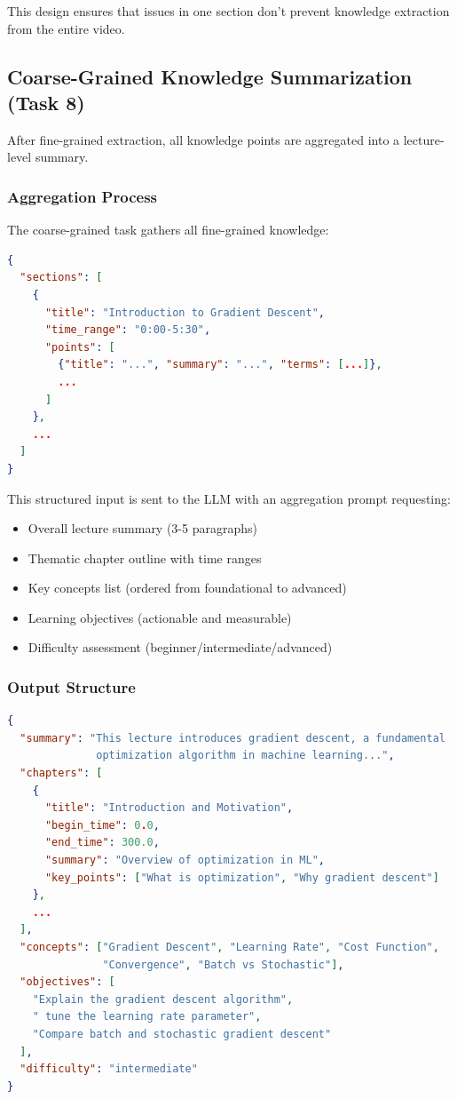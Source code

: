 This design ensures that issues in one section don't prevent knowledge extraction from the entire video.

\subsection{Coarse-Grained Knowledge Summarization (Task 8)}

After fine-grained extraction, all knowledge points are aggregated into a lecture-level summary.

\subsubsection{Aggregation Process}

The coarse-grained task gathers all fine-grained knowledge:

\begin{lstlisting}[language=json, caption={Input to Coarse-Grained Task}]
{
  "sections": [
    {
      "title": "Introduction to Gradient Descent",
      "time_range": "0:00-5:30",
      "points": [
        {"title": "...", "summary": "...", "terms": [...]},
        ...
      ]
    },
    ...
  ]
}
\end{lstlisting}

This structured input is sent to the LLM with an aggregation prompt requesting:

\begin{itemize}
    \item Overall lecture summary (3-5 paragraphs)
    \item Thematic chapter outline with time ranges
    \item Key concepts list (ordered from foundational to advanced)
    \item Learning objectives (actionable and measurable)
    \item Difficulty assessment (beginner/intermediate/advanced)
\end{itemize}

\subsubsection{Output Structure}

\begin{lstlisting}[language=json, caption={Coarse-Grained Summary Output}]
{
  "summary": "This lecture introduces gradient descent, a fundamental 
              optimization algorithm in machine learning...",
  "chapters": [
    {
      "title": "Introduction and Motivation",
      "begin_time": 0.0,
      "end_time": 300.0,
      "summary": "Overview of optimization in ML",
      "key_points": ["What is optimization", "Why gradient descent"]
    },
    ...
  ],
  "concepts": ["Gradient Descent", "Learning Rate", "Cost Function", 
               "Convergence", "Batch vs Stochastic"],
  "objectives": [
    "Explain the gradient descent algorithm",
    " tune the learning rate parameter",
    "Compare batch and stochastic gradient descent"
  ],
  "difficulty": "intermediate"
}
\end{lstlisting}

